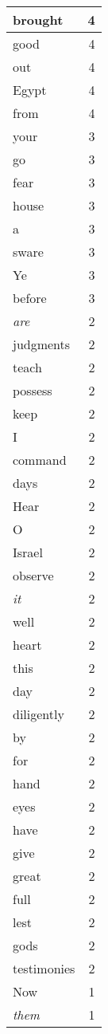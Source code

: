 \begin{center}
\begin{longtable}{l|r}
brought & 4 \\ \hline
good & 4 \\ \hline
out & 4 \\ \hline
Egypt & 4 \\ \hline
from & 4 \\ \hline
your & 3 \\ \hline
go & 3 \\ \hline
fear & 3 \\ \hline
house & 3 \\ \hline
a & 3 \\ \hline
sware & 3 \\ \hline
Ye & 3 \\ \hline
before & 3 \\ \hline
\emph{are} & 2 \\ \hline
judgments & 2 \\ \hline
teach & 2 \\ \hline
possess & 2 \\ \hline
keep & 2 \\ \hline
I & 2 \\ \hline
command & 2 \\ \hline
days & 2 \\ \hline
Hear & 2 \\ \hline
O & 2 \\ \hline
Israel & 2 \\ \hline
observe & 2 \\ \hline
\emph{it} & 2 \\ \hline
well & 2 \\ \hline
heart & 2 \\ \hline
this & 2 \\ \hline
day & 2 \\ \hline
diligently & 2 \\ \hline
by & 2 \\ \hline
for & 2 \\ \hline
hand & 2 \\ \hline
eyes & 2 \\ \hline
have & 2 \\ \hline
give & 2 \\ \hline
great & 2 \\ \hline
full & 2 \\ \hline
lest & 2 \\ \hline
gods & 2 \\ \hline
testimonies & 2 \\ \hline
Now & 1 \\ \hline
\emph{them} & 1 \\ \hline

\end{longtable}
\end{center}
